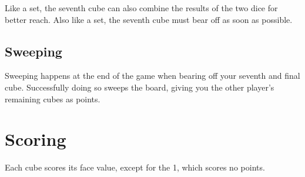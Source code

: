\documentclass[a4paper]{article}
\begin{document}
Like a set, the seventh cube can also combine the results of the two dice for better reach.
Also like a set, the seventh cube must bear off as soon as possible.

\subsection{Sweeping}
Sweeping happens at the end of the game when bearing off your seventh and final cube.
Successfully doing so sweeps the board, giving you the other player's remaining cubes as points.

\section{Scoring}
Each cube scores its face value, except for the 1, which scores no points.
\end{document}
